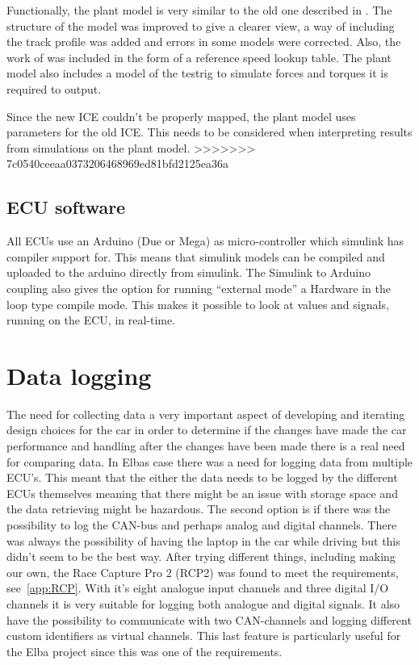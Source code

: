 Functionally, the plant model is very similar to the old one described in \cite{elba2015}. The structure of the model was improved to give a clearer view, a way of including the track profile was added and errors in some models were corrected. Also, the work of \citep{liu2016} was included in the form of a reference speed lookup table. The plant model also includes a model of the testrig to simulate forces and torques it is required to output.

Since the new ICE couldn't be properly mapped, the plant model uses parameters for the old ICE. This needs to be considered when interpreting results from simulations on the plant model.
>>>>>>> 7c0540ceeaa0373206468969ed81bfd2125ea36a

\subsection{ECU software}
All ECUs use an Arduino (Due or Mega) as micro-controller which simulink has
compiler support for. This means that simulink models can be compiled and
uploaded to the arduino directly from simulink. The Simulink to Arduino coupling also
gives the option for running ``external mode'' a Hardware in the loop type compile mode.
This makes it possible to look at values and signals, running on the ECU, in
real-time.

\section{Data logging}
The need for collecting data a very important aspect of developing and
iterating design choices for the car in order to determine if the changes have
made the car performance and handling after the changes have been made there
is a real need for comparing data. In Elbas case there was a need for logging
data from multiple ECU's. This meant that the either the data needs to be logged
by the different ECUs themselves meaning that there might be an issue with
storage space and the data retrieving might be hazardous. The second option is
if there was the possibility to log the CAN-bus and perhaps analog and digital
channels. There was always the possibility of having the laptop in the car while
driving but this didn't seem to be the best way. After trying different things,
including making our own, the Race Capture Pro 2 (RCP2) was found to meet the
requirements, see~\ref{app:RCP}. With it's eight analogue input channels and
three digital I/O channels it is very suitable for logging both analogue and
digital signals. It also have the possibility to communicate with two
CAN-channels and logging different custom identifiers as virtual channels. This
last feature is particularly useful for the Elba project since this was one of
the requirements.


